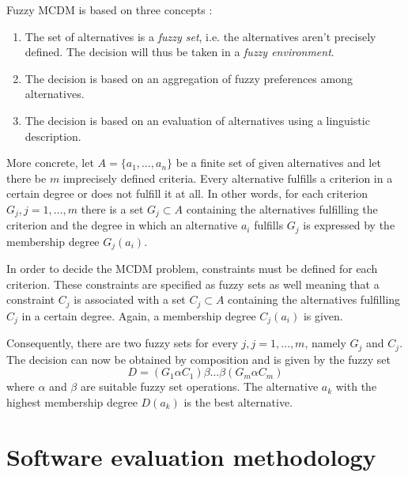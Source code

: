 Fuzzy MCDM is based on three concepts \cite{FuzzySetApproach}:

\begin{enumerate}
    \item The set of alternatives is a \emph{fuzzy set}, i.e. the alternatives aren't precisely defined. The decision will thus be taken in a \emph{fuzzy environment}. 
    \item The decision is based on an aggregation of fuzzy preferences among alternatives.
    \item The decision is based on an evaluation of alternatives using a linguistic description.
\end{enumerate}

More concrete, let $A = \{a_1, \ldots, a_n\}$ be a finite set of given alternatives and let there be $m$ imprecisely defined criteria. Every alternative fulfills a criterion in a certain degree or does not fulfill it at all. In other words, for each criterion $G_j, j = 1, \ldots, m$ there is a set $G_j \subset A$ containing the alternatives fulfilling the criterion and the degree in which an alternative $a_i$ fulfills $G_j$ is expressed by the membership degree $G_j(a_i)$.

In order to decide the MCDM problem, constraints must be defined for each criterion. These constraints are specified as fuzzy sets as well meaning that a constraint $C_j$ is associated with a set $C_j \subset A$ containing the alternatives fulfilling $C_j$ in a certain degree. Again, a membership degree $C_j(a_i)$ is given.

Consequently, there are two fuzzy sets for every $j, j = 1, \ldots, m$, namely $G_j$ and $C_j$. The decision can now be obtained by composition and is given by the fuzzy set 
\begin{equation}
    D = (G_1 \alpha C_1) \beta \ldots \beta (G_m \alpha C_m)
\end{equation}
where $\alpha$ and $\beta$ are suitable fuzzy set operations. The alternative $a_k$ with the highest membership degree $D(a_k)$ is the best alternative.





\section{Software evaluation methodology}
\label{sec:selection_method}

